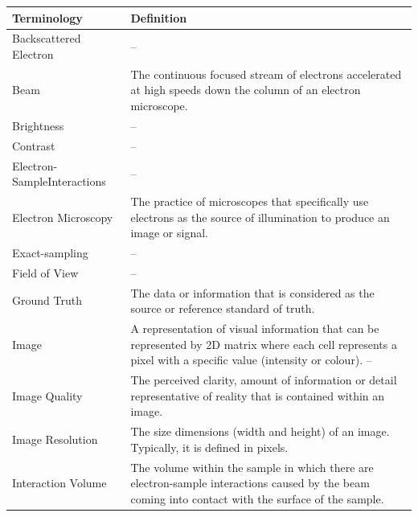 \documentclass[12pt]{article}
\begin{document}
\begin{center}
    \noindent
    \begin{longtable}{p{4.25cm} p{11.25cm}} 
        \toprule
        \textbf{Terminology} & \textbf{Definition}\\
        \midrule
        Backscattered Electron & -- \\
        
        Beam & The continuous focused stream of electrons accelerated at high speeds down the column of an electron microscope. \\
        
        Brightness & -- \\
        
        Contrast & -- \\
        
        Electron-Sample\newline Interactions & -- \\
        
        Electron Microscopy & The practice of microscopes that specifically use electrons as the source of illumination to produce an image or signal.  \\
        
        Exact-sampling & -- \\
        
        Field of View & -- \\
        
        Ground Truth & The data or information that is considered as the source or reference standard of truth. \\
        
        Image & A representation of visual information that can be represented by 2D matrix where each cell represents a pixel with a specific value (intensity or colour). -- \\
        
        Image Quality & The perceived clarity, amount of information or detail representative of reality that is contained within an image. \\
        
        Image Resolution & The size dimensions (width and height) of an image. Typically, it is defined in pixels. \\
        
        Interaction Volume & The volume within the sample in which there are electron-sample interactions caused by the beam coming into contact with the surface of the sample. \\
        

\end{longtable}
\end{center}
\end{document}
